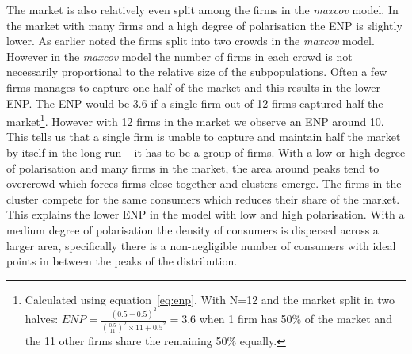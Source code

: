 \documentclass[preprint, 12pt]{elsarticle}
\begin{document}
The market is also relatively even split among the firms in the \emph{maxcov} model. In the market with many firms and a high degree of polarisation the ENP is slightly lower. As earlier noted the firms split into two crowds in the \emph{maxcov} model. However in the \emph{maxcov} model the number of firms in each crowd is not necessarily proportional to the relative size of the subpopulations. Often a few firms manages to capture one-half of the market and this results in the lower ENP. The ENP would be 3.6 if a single firm out of 12 firms captured half the market\footnote{Calculated using equation~\ref{eq:enp}. With N=12 and the market split in two halves: $ENP = \frac {(0.5+0.5)^2}{\left(\frac{0.5}{11}\right)^2 \times 11 + 0.5^2} = 3.6$ when 1 firm has 50\% of the market and the 11 other firms share the remaining 50\% equally.}. However with 12 firms in the market we observe an ENP around 10. This tells us that a single firm is unable to capture and maintain half the market by itself in the long-run -- it has to be a group of firms. With a low or high degree of polarisation and many firms in the market, the area around peaks tend to overcrowd which forces firms close together and clusters emerge. The firms in the cluster compete for the same consumers which reduces their share of the market. This explains the lower ENP in the model with low and high polarisation. With a medium degree of polarisation the density of consumers is dispersed across a larger area, specifically there is a non-negligible number of consumers with ideal points in between the peaks of the distribution.
\end{document}
